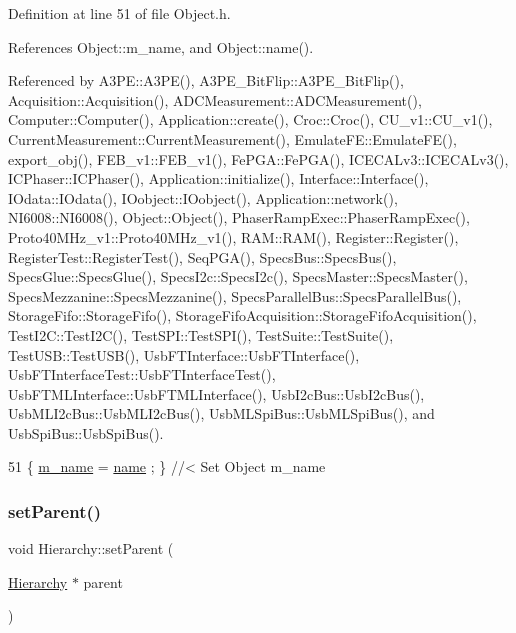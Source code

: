 Definition at line 51 of file Object.\+h.



References Object\+::m\+\_\+name, and Object\+::name().



Referenced by A3\+P\+E\+::\+A3\+P\+E(), A3\+P\+E\+\_\+\+Bit\+Flip\+::\+A3\+P\+E\+\_\+\+Bit\+Flip(), Acquisition\+::\+Acquisition(), A\+D\+C\+Measurement\+::\+A\+D\+C\+Measurement(), Computer\+::\+Computer(), Application\+::create(), Croc\+::\+Croc(), C\+U\+\_\+v1\+::\+C\+U\+\_\+v1(), Current\+Measurement\+::\+Current\+Measurement(), Emulate\+F\+E\+::\+Emulate\+F\+E(), export\+\_\+obj(), F\+E\+B\+\_\+v1\+::\+F\+E\+B\+\_\+v1(), Fe\+P\+G\+A\+::\+Fe\+P\+G\+A(), I\+C\+E\+C\+A\+Lv3\+::\+I\+C\+E\+C\+A\+Lv3(), I\+C\+Phaser\+::\+I\+C\+Phaser(), Application\+::initialize(), Interface\+::\+Interface(), I\+Odata\+::\+I\+Odata(), I\+Oobject\+::\+I\+Oobject(), Application\+::network(), N\+I6008\+::\+N\+I6008(), Object\+::\+Object(), Phaser\+Ramp\+Exec\+::\+Phaser\+Ramp\+Exec(), Proto40\+M\+Hz\+\_\+v1\+::\+Proto40\+M\+Hz\+\_\+v1(), R\+A\+M\+::\+R\+A\+M(), Register\+::\+Register(), Register\+Test\+::\+Register\+Test(), Seq\+P\+G\+A(), Specs\+Bus\+::\+Specs\+Bus(), Specs\+Glue\+::\+Specs\+Glue(), Specs\+I2c\+::\+Specs\+I2c(), Specs\+Master\+::\+Specs\+Master(), Specs\+Mezzanine\+::\+Specs\+Mezzanine(), Specs\+Parallel\+Bus\+::\+Specs\+Parallel\+Bus(), Storage\+Fifo\+::\+Storage\+Fifo(), Storage\+Fifo\+Acquisition\+::\+Storage\+Fifo\+Acquisition(), Test\+I2\+C\+::\+Test\+I2\+C(), Test\+S\+P\+I\+::\+Test\+S\+P\+I(), Test\+Suite\+::\+Test\+Suite(), Test\+U\+S\+B\+::\+Test\+U\+S\+B(), Usb\+F\+T\+Interface\+::\+Usb\+F\+T\+Interface(), Usb\+F\+T\+Interface\+Test\+::\+Usb\+F\+T\+Interface\+Test(), Usb\+F\+T\+M\+L\+Interface\+::\+Usb\+F\+T\+M\+L\+Interface(), Usb\+I2c\+Bus\+::\+Usb\+I2c\+Bus(), Usb\+M\+L\+I2c\+Bus\+::\+Usb\+M\+L\+I2c\+Bus(), Usb\+M\+L\+Spi\+Bus\+::\+Usb\+M\+L\+Spi\+Bus(), and Usb\+Spi\+Bus\+::\+Usb\+Spi\+Bus().


\begin{DoxyCode}
51 \{ \hyperlink{classObject_a8b83c95c705d2c3ba0d081fe1710f48d}{m\_name}  = \hyperlink{classObject_a300f4c05dd468c7bb8b3c968868443c1}{name}  ; \} \textcolor{comment}{//< Set Object m\_name}
\end{DoxyCode}
\mbox{\label{classHierarchy_a585ad1aeec16077a0e532ab8b4fc557b}} 
\subsubsection{\texorpdfstring{set\+Parent()}{setParent()}}
{\footnotesize\ttfamily void Hierarchy\+::set\+Parent (\begin{DoxyParamCaption}\item[{\hyperlink{classHierarchy}{Hierarchy} $\ast$}]{parent }\end{DoxyParamCaption})\hspace{0.3cm}{\ttfamily [inherited]}}




